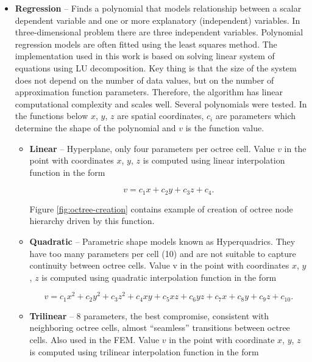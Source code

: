 \begin{itemize}
  \item \textbf{Regression} -- Finds a polynomial that models relationship between a scalar dependent variable and one or more explanatory (independent) variables. In three-dimensional problem there are three independent variables. Polynomial regression models are often fitted using the least squares method. The implementation used in this work is based on solving linear system of equations using LU decomposition. Key thing is that the size of the system does not depend on the number of data values, but on the number of approximation function parameters. Therefore, the algorithm has linear computational complexity and scales well. Several polynomials were tested. In the functions below $x$, $y$, $z$ are spatial coordinates, $c_i$ are parameters which determine the shape of the polynomial and $v$ is the function value.

  \begin{itemize}
    \item \textbf{Linear} -- Hyperplane, only four parameters per octree cell. Value $v$ in the point with coordinates $x$, $y$, $z$ is computed using linear interpolation function in the form
    
    \begin{equation}
    v=c_{1}x + c_{2}y + c_{3}z + c_{4}.
    \end{equation}
    
    Figure \ref{fig:octree-creation} contains example of creation of octree node hierarchy driven by this function.
    
    \item \textbf{Quadratic} -- Parametric shape models known as Hyperquadrics. They have too many parameters per cell (10) and are not suitable to capture continuity between octree cells. Value v in the point with coordinates $x$, $y$, $z$ is computed using quadratic interpolation function in the form

    \begin{equation}
      v=c_{1}x^2 + c_{2}y^2 + c_{3}z^2 + c_{4}xy + c_{5}xz + c_{6}yz + c_{7}x + c_{8}y + c_{9}z + c_{10}.
    \end{equation}

    \item \textbf{Trilinear} -- 8 parameters, the best compromise, consistent with neighboring octree cells, almost “seamless” transitions between octree cells. Also used in the FEM. Value $v$ in the point with coordinate $x$, $y$, $z$ is computed using trilinear interpolation function in the form
    

\end{itemize}
\end{itemize}
